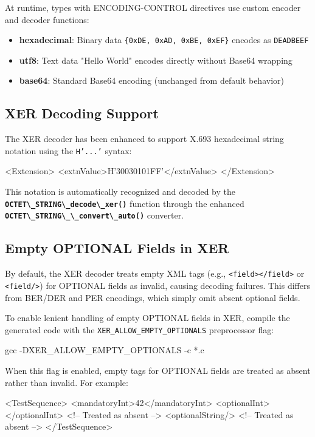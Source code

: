 \documentclass[english,oneside,12pt]{book}
\newcommand{\code}[1]{\texttt{\textbf{\lstinline{#1}}}}
\begin{document}
At runtime, types with ENCODING-CONTROL directives use custom encoder and decoder functions:

\begin{itemize}
\item \textbf{hexadecimal}: Binary data \texttt{\{0xDE, 0xAD, 0xBE, 0xEF\}} encodes as \texttt{DEADBEEF}
\item \textbf{utf8}: Text data "Hello World" encodes directly without Base64 wrapping
\item \textbf{base64}: Standard Base64 encoding (unchanged from default behavior)
\end{itemize}

\subsection*{XER Decoding Support}

The XER decoder has been enhanced to support X.693 hexadecimal string notation using 
the \texttt{H'...'} syntax:

\begin{example}
<Extension>
    <extnValue>H'30030101FF'</extnValue>
</Extension>
\end{example}

This notation is automatically recognized and decoded by the \code{OCTET\_STRING\_decode\_xer()} 
function through the enhanced \code{OCTET\_STRING\_\_convert\_auto()} converter.

\subsection*{Empty OPTIONAL Fields in XER}

By default, the XER decoder treats empty XML tags (e.g., \texttt{<field></field>} or 
\texttt{<field/>}) for OPTIONAL fields as invalid, causing decoding failures. This differs 
from BER/DER and PER encodings, which simply omit absent optional fields.

To enable lenient handling of empty OPTIONAL fields in XER, compile the generated code 
with the \texttt{XER\_ALLOW\_EMPTY\_OPTIONALS} preprocessor flag:

\begin{bash}
gcc -DXER_ALLOW_EMPTY_OPTIONALS -c *.c
\end{bash}

When this flag is enabled, empty tags for OPTIONAL fields are treated as absent rather 
than invalid. For example:

\begin{example}
<TestSequence>
    <mandatoryInt>42</mandatoryInt>
    <optionalInt></optionalInt>    <!-- Treated as absent -->
    <optionalString/>              <!-- Treated as absent -->
</TestSequence>
\end{example}
\end{document}
